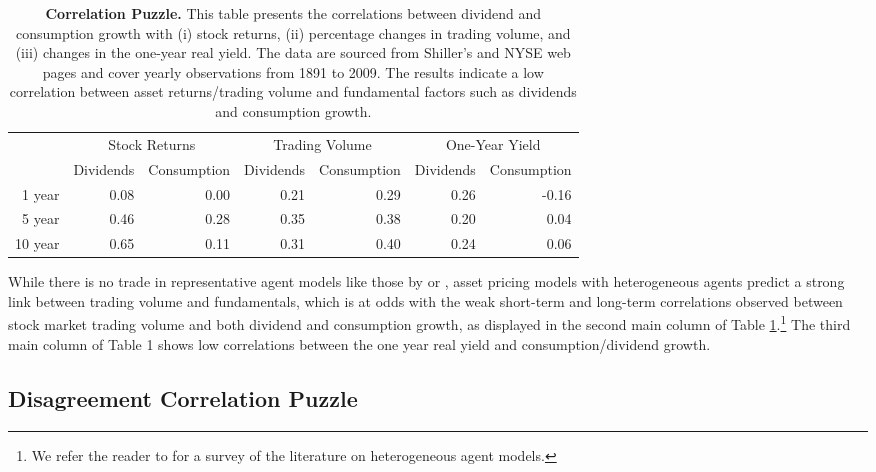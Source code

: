 \documentclass[preprint,11pt,authoryear]{elsarticle}
\theoremstyle{plain}
\begin{document}
 \begin{table}[htbp]
 \centering
  \begin{tabular}{r|rr|rr|rr}
   \toprule
   & \multicolumn{2}{c}{Stock Returns} & \multicolumn{2}{c}{Trading Volume} & \multicolumn{2}{c}{One-Year Yield} \\
   & Dividends & Consumption &Dividends & Consumption  &Dividends & Consumption \\
   \hline
    1 year & 0.08 & 0.00 & 0.21 & 0.29 & 0.26 & -0.16 \\
    5 year & 0.46 & 0.28 & 0.35 & 0.38 & 0.20 & 0.04 \\
    10 year & 0.65 & 0.11 & 0.31 & 0.40 & 0.24 & 0.06 \\
    \bottomrule
 \end{tabular}
  \caption{{\bf Correlation Puzzle.} This table presents the correlations between dividend and consumption growth with (i) stock returns, (ii) percentage changes in trading volume, and (iii) changes in the one-year real yield. The data are sourced from Shiller's and NYSE web pages and cover yearly observations from 1891 to 2009. The results indicate a low correlation between asset returns/trading volume and fundamental factors such as dividends and consumption growth.}
 \label{table:CorrelationPuzzle}
 \end{table}
 While there is no trade in representative agent models like those by \cite{campbell-cochrane:99} or \cite{bansal-yaron:04}, asset pricing models with heterogeneous agents predict a strong link between trading volume and fundamentals, which is at odds with the weak short-term and long-term correlations observed between stock market trading volume and both dividend and consumption growth, as displayed in the second main column of Table \ref{table:CorrelationPuzzle}.\footnote{We refer the reader to \cite{panageas:2020} for a survey of the literature on heterogeneous agent models.} The third main column of Table 1 shows low correlations between the one year real yield and consumption/dividend growth. %


\subsection{Disagreement Correlation Puzzle} \label{sec:dis}
\end{document}
